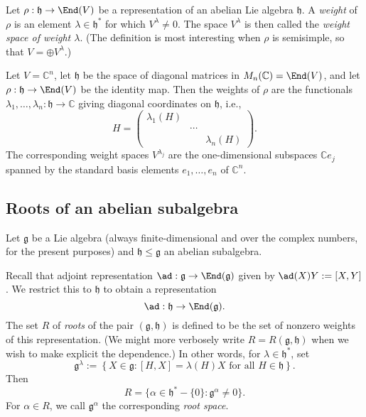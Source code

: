 \documentclass[reqno]{amsart} 
\begin{document}
\begin{definition}
  Let $\rho : \mathfrak{h} \rightarrow \End(V)$ be a representation of an abelian Lie algebra $\mathfrak{h}$.  A \emph{weight} of $\rho$ is an element $\lambda \in \mathfrak{h}^*$ for which $V^\lambda \neq 0$.  The space $V^\lambda$ is then called the \emph{weight space of weight $\lambda$}.  (The definition is most interesting when $\rho$ is semisimple, so that $V = \oplus V^\lambda$.)
\end{definition}

\begin{example}
  Let $V = \mathbb{C}^n$, let $\mathfrak{h}$ be the space of diagonal matrices in $M_n(\mathbb{C}) = \End(V)$, and let $\rho : \mathfrak{h} \rightarrow \End(V)$ be the identity map.  Then the weights of $\rho$ are the functionals $\lambda_1,\dotsc,\lambda_n : \mathfrak{h} \rightarrow \mathbb{C}$ giving diagonal coordinates on $\mathfrak{h}$, i.e.,
  \begin{equation*}
    H =
    \begin{pmatrix}
      \lambda_1(H) &  &  \\
             & \dotsb  &  \\
             &  & \lambda_n(H)
    \end{pmatrix}
.
  \end{equation*}
  The corresponding weight spaces $V^{\lambda_j}$ are the one-dimensional subspaces $\mathbb{C} e_j$ spanned by the standard basis elements $e_1,\dotsc,e_n$ of $\mathbb{C}^n$.
\end{example}


\subsection{Roots of an abelian subalgebra\label{sec:roots-of-abelian-subalgebra}}
\label{sec:orgccb748c}
Let $\mathfrak{g}$ be a Lie algebra (always finite-dimensional and over the complex numbers, for the present purposes) and $\mathfrak{h} \leq \mathfrak{g}$ an abelian subalgebra.

Recall that adjoint representation $\ad : \mathfrak{g} \rightarrow \End(\mathfrak{g})$ given by $\ad(X) Y := [X,Y]$.  We restrict this to $\mathfrak{h}$ to obtain a representation
\begin{equation*}
  \ad : \mathfrak{h} \rightarrow \End(\mathfrak{g}).
\end{equation*}
The set $R$ of \emph{roots} of the pair $(\mathfrak{g},\mathfrak{h})$ is defined to be the set of nonzero weights of this representation.  (We might more verbosely write $R = R(\mathfrak{g},\mathfrak{h})$ when we wish to make explicit the dependence.)  In other words, for $\lambda \in \mathfrak{h}^*$, set
\begin{equation*}
  \mathfrak{g}^\lambda := \left\{ X \in \mathfrak{g} : [H,X] = \lambda(H) X \text{ for all } H \in \mathfrak{h} \right\}.
\end{equation*}
Then
\begin{equation}
  R = \{\alpha \in \mathfrak{h}^* - \{0\} : \mathfrak{g}^\alpha
  \neq 0 \}.
\end{equation}
For $\alpha \in R$, we call $\mathfrak{g}^\alpha$ the corresponding \emph{root space}.
\end{document}
